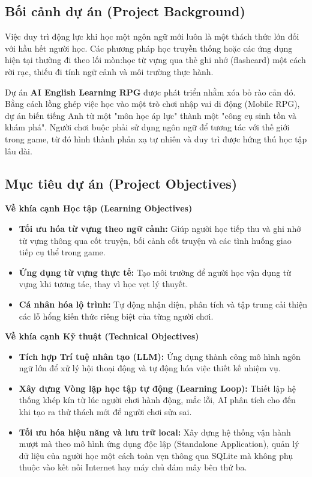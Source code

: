 \subsection{Bối cảnh dự án (Project Background)}
Việc duy trì động lực khi học một ngôn ngữ mới luôn là một thách thức lớn đối với hầu hết người học. Các phương pháp học truyền thống hoặc các ứng dụng hiện tại thường đi theo lối mòn:học từ vựng qua thẻ ghi nhớ (flashcard) một cách rời rạc, thiếu đi tính ngữ cảnh và môi trường thực hành.

Dự án \textbf{AI English Learning RPG} được phát triển nhằm xóa bỏ rào cản đó. Bằng cách lồng ghép việc học vào một trò chơi nhập vai di động (Mobile RPG), dự án biến tiếng Anh từ một "môn học áp lực" thành một "công cụ sinh tồn và khám phá". Người chơi buộc phải sử dụng ngôn ngữ để tương tác với thế giới trong game, từ đó hình thành phản xạ tự nhiên và duy trì được hứng thú học tập lâu dài.

\subsection{Mục tiêu dự án (Project Objectives)}

\noindent \textbf{Về khía cạnh Học tập (Learning Objectives)}
\begin{itemize}
    \item \textbf{Tối ưu hóa từ vựng theo ngữ cảnh:} Giúp người học tiếp thu và ghi nhớ từ vựng thông qua cốt truyện, bối cảnh cốt truyện và các tình huống giao tiếp cụ thể trong game.
    \item \textbf{Ứng dụng từ vựng thực tế:} Tạo môi trường để người học vận dụng từ vựng khi tương tác, thay vì học vẹt lý thuyết.
    \item \textbf{Cá nhân hóa lộ trình:} Tự động nhận diện, phân tích và tập trung cải thiện các lỗ hổng kiến thức riêng biệt của từng người chơi.
\end{itemize}

\noindent \textbf{Về khía cạnh Kỹ thuật (Technical Objectives)}
\begin{itemize}
    \item \textbf{Tích hợp Trí tuệ nhân tạo (LLM):} Ứng dụng thành công mô hình ngôn ngữ lớn để xử lý hội thoại động và tự động hóa việc thiết kế nhiệm vụ.
    \item \textbf{Xây dựng Vòng lặp học tập tự động (Learning Loop):} Thiết lập hệ thống khép kín từ lúc người chơi hành động, mắc lỗi, AI phân tích cho đến khi tạo ra thử thách mới để người chơi sửa sai.
    \item \textbf{Tối ưu hóa hiệu năng và lưu trữ local:} Xây dựng hệ thống vận hành mượt mà theo mô hình ứng dụng độc lập (Standalone Application), quản lý dữ liệu của người học một cách toàn vẹn thông qua SQLite mà không phụ thuộc vào kết nối Internet hay máy chủ đám mây bên thứ ba.
\end{itemize}

